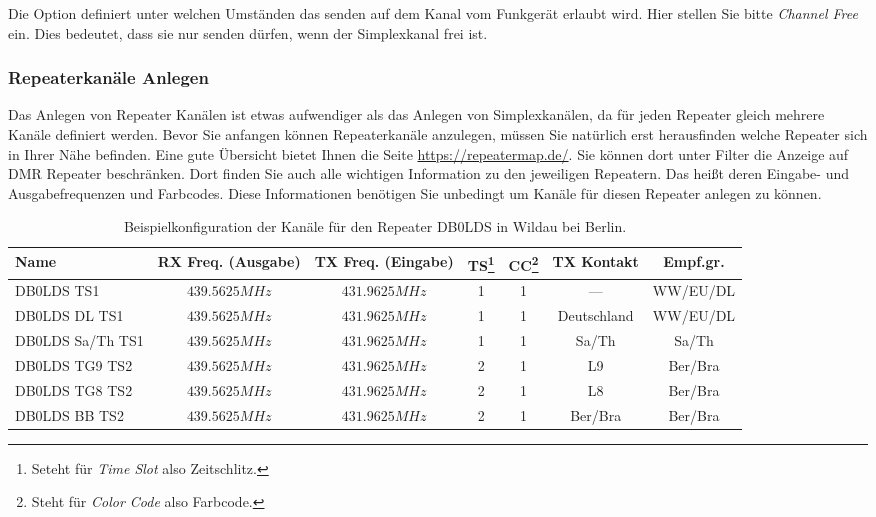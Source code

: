 Die Option  definiert unter welchen Umständen das senden auf dem Kanal vom Funkgerät erlaubt wird. Hier stellen Sie bitte \emph{Channel Free} ein. Dies bedeutet, dass sie nur senden dürfen, wenn der Simplexkanal frei ist.  

\subsubsection{Repeaterkanäle Anlegen}
Das Anlegen von Repeater Kanälen ist etwas aufwendiger als das Anlegen von Simplexkanälen, da für jeden Repeater gleich mehrere Kanäle definiert werden. Bevor Sie anfangen können Repeaterkanäle anzulegen, müssen Sie natürlich erst herausfinden welche Repeater sich in Ihrer Nähe befinden. Eine gute Übersicht bietet Ihnen die Seite \url{https://repeatermap.de/}. Sie können dort unter Filter die Anzeige auf DMR Repeater beschränken. Dort finden Sie auch alle wichtigen Information zu den jeweiligen Repeatern. Das heißt deren Eingabe- und Ausgabefrequenzen und Farbcodes. Diese Informationen benötigen Sie unbedingt um Kanäle für diesen Repeater anlegen zu können.

\begin{sidewaystable}[p]
 \centering
 \begin{tabular}{|l|c|c|c|c|c|c|} \hline
  Name             & RX Freq. (Ausgabe) & TX Freq. (Eingabe) & TS\footnote{Seteht für \emph{Time Slot} also Zeitschlitz.} & CC\footnote{Steht für \emph{Color Code} also Farbcode.} & TX Kontakt & Empf.gr. \\ \hline
  DB0LDS TS1       & $439.5625 MHz$ & $431.9625 MHz$ & 1 & 1 & ---         & WW/EU/DL \\
  DB0LDS DL TS1    & $439.5625 MHz$ & $431.9625 MHz$ & 1 & 1 & Deutschland & WW/EU/DL \\
  DB0LDS Sa/Th TS1 & $439.5625 MHz$ & $431.9625 MHz$ & 1 & 1 & Sa/Th       & Sa/Th \\
  DB0LDS TG9 TS2    & $439.5625 MHz$ & $431.9625 MHz$ & 2 & 1 & L9          & Ber/Bra \\
  DB0LDS TG8 TS2    & $439.5625 MHz$ & $431.9625 MHz$ & 2 & 1 & L8          & Ber/Bra \\
  DB0LDS BB TS2    & $439.5625 MHz$ & $431.9625 MHz$ & 2 & 1 & Ber/Bra     & Ber/Bra \\ \hline
 \end{tabular}
 \caption{Beispielkonfiguration der Kanäle für den Repeater DB0LDS in Wildau bei Berlin.} \label{tab:ch:repeater}
\end{sidewaystable}

